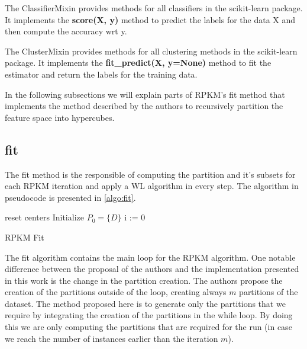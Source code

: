 The ClassifierMixin provides methods for all classifiers in the scikit-learn package. It implements the \textbf{score(X, y)} method to predict the labels for the data X and then compute the accuracy wrt y.

The ClusterMixin provides methods for all clustering methods in the scikit-learn package. It implements the \textbf{fit\_predict(X, y=None)} method to fit the estimator and return the labels for the training data.

In the following subsections we will explain parts of RPKM's fit method that implements the method described by the authors to recursively partition the feature space into hypercubes.

\subsection{fit}

The fit method is the responsible of computing the partition and it's subsets for each RPKM iteration and apply a WL algorithm in every step. The algorithm in pseudocode is presented in \ref{algo:fit}.


\begin{algorithm}[H]
    \SetAlgoLined
    reset centers\;
    Initialize $P_0 = \{D\}$\;
    i := 0\;
    \label{algo:fit}
    \caption{RPKM Fit}
\end{algorithm}

The fit algorithm contains the main loop for the RPKM algorithm. One notable difference between the proposal of the authors and the implementation presented in this work is the change in the partition creation. The authors propose the creation of the partitions outside of the loop, creating always $m$ partitions of the dataset. The method proposed here is to generate only the partitions that we require by integrating the creation of the partitions in the while loop. By doing this we are only computing the partitions that are required for the run (in case we reach the number of instances earlier than the iteration $m$).

